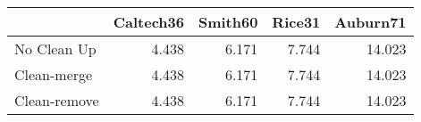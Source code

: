 \begin{tabular}{lrrrr}
\toprule
{} & Caltech36 & Smith60 & Rice31 & Auburn71 \\
\midrule
No Clean Up  &     4.438 &   6.171 &  7.744 &   14.023 \\
Clean-merge  &     4.438 &   6.171 &  7.744 &   14.023 \\
Clean-remove &     4.438 &   6.171 &  7.744 &   14.023 \\
\bottomrule
\end{tabular}

